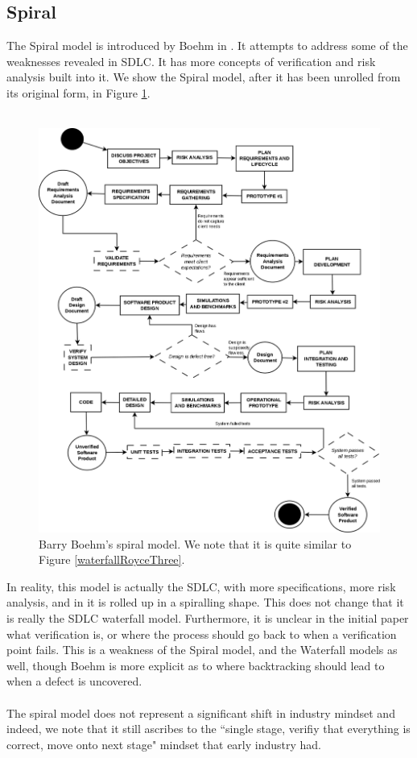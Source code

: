 \subsection{Spiral}
The Spiral model is introduced by Boehm in \cite{Boehm:1986:SMS:12944.12948}.
It attempts to address some of the weaknesses revealed in SDLC.
It has more concepts of verification and risk analysis built into it.
We show the Spiral model, after it has been unrolled from its original form, in Figure
\ref{Spiral}.\\
\\

\begin{figure}[ht!]
	\includegraphics[scale=0.3]{media/Spiral}
	\caption{Barry Boehm's spiral model. We note that it is quite similar to Figure
		\ref{waterfallRoyceThree}.}
	\label{Spiral}
\end{figure}

In reality, this model is actually the SDLC, with more specifications, more risk analysis, and
in \cite{Boehm:1986:SMS:12944.12948} it is rolled up in a spiralling shape.
This does not change that it is really the SDLC waterfall model.
Furthermore, it is unclear in the initial paper what verification is, or where the process should go
back to when a verification point fails.
This is a weakness of the Spiral model, and the Waterfall models as well, though Boehm is more
explicit as to where backtracking should lead to when a defect is uncovered.\\
\\
The spiral model does not represent a significant shift in industry mindset and indeed, we note that
it still ascribes to the ``single stage, verifiy that everything is correct, move onto next stage"
mindset that early industry had.

